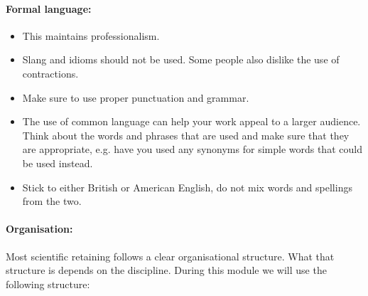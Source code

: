 \paragraph{Formal language:}
\begin{itemize}
\setlength{\itemsep}{-5pt}
    \item This maintains professionalism.
    \item Slang and idioms should not be used. Some people also dislike the use of contractions.
    \item Make sure to use proper punctuation and grammar.
    \item The use of common language can help your work appeal to a larger audience. Think about the words and phrases that are used and make sure that they are appropriate, e.g. have you used any synonyms for simple words that could be used instead.
    \item Stick to either British or American English, do not mix words and spellings from the two.
\end{itemize}

\paragraph{Organisation:} Most scientific retaining follows a clear organisational structure. What that structure is depends on the discipline. During this module we will use the following structure:

